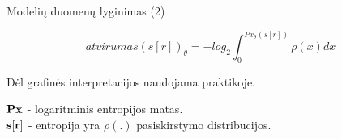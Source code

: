 \begin{frame}[c]{Modelių duomenų lyginimas (2)}

\begin{equation}
    atvirumas(s[r])_{\theta} = -log_{2} \int_{0}^{Px_{\theta}(s[r])} \rho(x)dx
\end{equation}

Dėl grafinės interpretacijos naudojama praktikoje.

$\bf Px$ - logaritminis entropijos matas. \\
$\bf s[r]$ - entropija yra $\rho(.)$ pasiskirstymo distribucijos.

\end{frame}